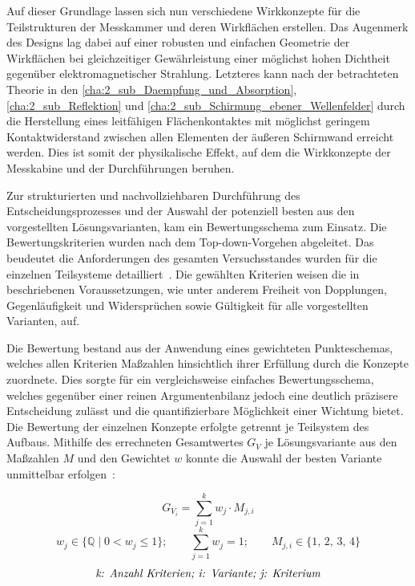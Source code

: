 Auf dieser Grundlage lassen sich nun verschiedene Wirkkonzepte für die Teilstrukturen der Messkammer und deren Wirkflächen erstellen. Das Augenmerk des Designs lag dabei auf einer robusten und einfachen Geometrie der Wirkflächen bei gleichzeitiger Gewährleistung einer möglichst hohen Dichtheit gegenüber elektromagnetischer Strahlung. Letzteres kann nach der betrachteten Theorie in den \Abschnitten\ref{cha:2_sub_Daempfung_und_Absorption}, \ref{cha:2_sub_Reflektion} und \ref{cha:2_sub_Schirmung_ebener_Wellenfelder} durch die Herstellung eines leitfähigen Flächenkontaktes mit möglichst geringem Kontaktwiderstand zwischen allen Elementen der äußeren Schirmwand erreicht werden. Dies ist somit der physikalische Effekt, auf dem die Wirkkonzepte der Messkabine und der Durchführungen beruhen. 
\par
\vspace{\linespace}
Zur strukturierten und nachvollziehbaren Durchführung des Entscheidungsprozesses und der Auswahl der potenziell besten aus den vorgestellten Lösungsvarianten, kam ein Bewertungsschema zum Einsatz. Die Bewertungskriterien wurden nach dem Top-down-Vorgehen abgeleitet. Das beudeutet die Anforderungen des gesamten Versuchsstandes wurden für die einzelnen Teilsysteme detailliert~\cite{Pahl_Beitz_Konstruktionslehre}. Die gewählten Kriterien weisen die in~\cite{Pahl_Beitz_Konstruktionslehre} beschriebenen Voraussetzungen, wie unter anderem Freiheit von Dopplungen, Gegenläufigkeit und Widersprüchen sowie Gültigkeit für alle vorgestellten Varianten, auf.
\par
\vspace{\linespace}
Die Bewertung bestand aus der Anwendung eines gewichteten Punkteschemas, welches allen Kriterien Maßzahlen hinsichtlich ihrer Erfüllung durch die Konzepte zuordnete. Dies sorgte für ein vergleichsweise einfaches Bewertungsschema, welches gegenüber einer reinen Argumentenbilanz jedoch eine deutlich präzisere Entscheidung zulässt und die quantifizierbare Möglichkeit einer Wichtung bietet. Die Bewertung der einzelnen Konzepte erfolgte getrennt je Teilsystem des Aufbaus. Mithilfe des errechneten Gesamtwertes $G_V$ je Lösungsvariante aus den Maßzahlen $M$ und den Gewichtet $w$ konnte die Auswahl der besten Variante unmittelbar erfolgen~\cite{Pahl_Beitz_Konstruktionslehre}:

\begin{equation}
    G_{V_i} = \sum_{j=1}^{k} w_j \cdot M_{j,i}
    \label{eq:3_Gesamtwert_Variantenvergleich}
\end{equation}
\begin{equation}
    w_j \in \{\mathbb{Q} \;\vert\; 0 < w_j \leq 1\}; \qquad \sum_{j=1}^{k} w_j = 1; \qquad M_{j,i} \in \{1,\,2,\,3,\,4\}
    \label{eq:3_Wichtung_Bewertung}
\end{equation}
\begin{equation*}
    \text{\textit{k: Anzahl Kriterien; i: Variante; j: Kriterium}}
\end{equation*}

